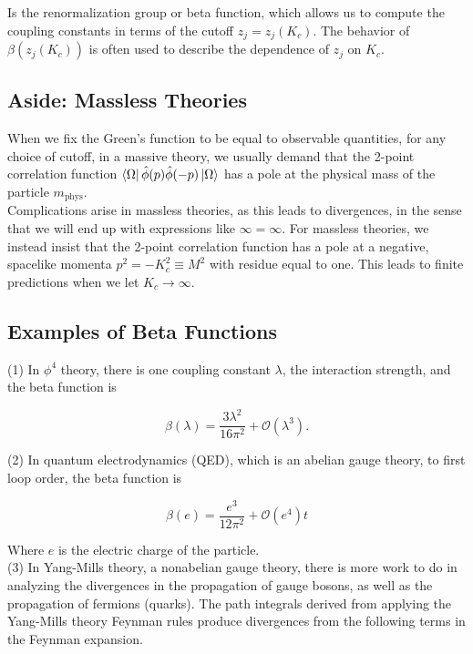 \noindent Is the renormalization group or beta function, which allows us to compute the coupling constants in terms of the cutoff $z_j = z_j(K_c)$. The behavior of $\beta (z_j(K_c))$ is often used to describe the dependence of $z_j$ on $K_c$. \\

\subsection*{Aside: Massless Theories}

\noindent When we fix the Green's function to be equal to observable quantities, for any choice of cutoff, in a massive theory, we usually demand that the 2-point correlation function $\bra{\Omega} \hat{\phi} (p) \hat{\phi} (-p) \ket{\Omega}$ has a pole at the physical mass of the particle $m_{\text{phys}}$. \\

\noindent Complications arise in massless theories, as this leads to divergences, in the sense that we will end up with expressions like $\infty = \infty$. For massless theories, we instead insist that the 2-point correlation function has a pole at a negative, spacelike momenta $p^2 = -K_c^2 \equiv M^2$ with residue equal to one. This leads to finite predictions when we let $K_c \rightarrow \infty$.

\subsection*{Examples of Beta Functions}

\noindent (1) In $\phi^4$ theory, there is one coupling constant $\lambda$, the interaction strength, and the beta function is 

\begin{equation}
\beta(\lambda) = \frac{3 \lambda^2}{16 \pi^2} + \mathcal{O}(\lambda^3).
\end{equation}

\noindent (2) In quantum electrodynamics (QED), which is an abelian gauge theory, to first loop order, the beta function is 

\begin{equation}
\beta(e) = \frac{e^3}{12 \pi^2} + \mathcal{O}(e^4)t
\end{equation}

\noindent Where $e$ is the electric charge of the particle. \\

\noindent (3) In Yang-Mills theory, a nonabelian gauge theory, there is more work to do in analyzing the divergences in the propagation of gauge bosons, as well as the propagation of fermions (quarks). The path integrals derived from applying the Yang-Mills theory Feynman rules produce divergences from the following terms in the Feynman expansion.

